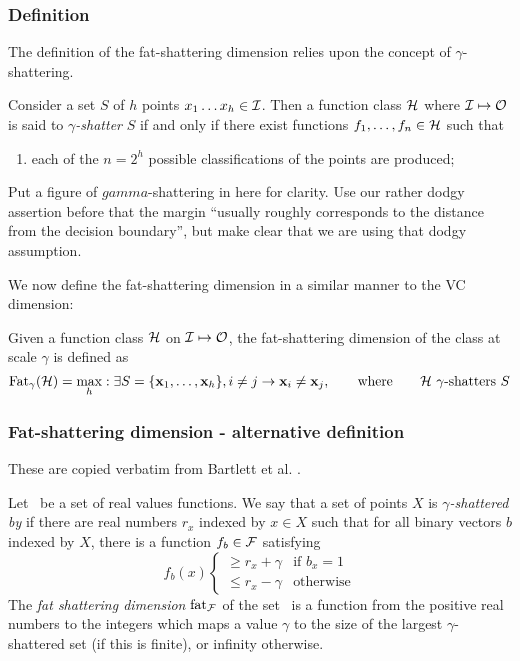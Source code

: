 \subsubsection{Definition}

The definition of the fat-shattering dimension relies upon the
concept of $\gamma$-shattering.

\begin{definition}
Consider a set $S$ of $h$ points $x_1 \ldots x_h \in \mathcal{I}$.  Then a
function class $\mathcal{H}$ where $\mathcal{I} \mapsto \mathcal{O}$ is said to
\emph{$\gamma$-shatter} $S$ if and only if there exist functions $f_1,
\ldots, f_n \in \mathcal{H}$ such that 
\begin{enumerate}
\item	each of the $n = 2^h$ possible classifications of the points
	are produced;
\end{enumerate}
\end{definition}

Put a figure of $gamma$-shattering in here for clarity.  Use our
rather dodgy assertion before that the margin ``usually roughly
corresponds to the distance from the decision boundary'', but make
clear that we are using that dodgy assumption.

We now define the fat-shattering dimension in a similar manner to the
VC dimension:

\begin{definition}
Given a function class $\mathcal{H}$ on $\mathcal{I} \mapsto \mathcal{O}$, the
fat-shattering dimension of the class at scale $\gamma$ is defined as
%
\begin{equation}
\mathrm{Fat}_{\gamma}(\mathcal{H}) = \max_{h} : \exists S = \{\mathbf{x}_1, \ldots, \mathbf{x}_h\},
i \neq j \rightarrow \mathbf{x}_i \neq \mathbf{x}_j,
\qquad \mbox{where} \qquad \mbox{\ensuremath{\mathcal{H}}\ $\gamma$-shatters $S$}
\end{equation}
\end{definition}


\subsubsection{Fat-shattering dimension - alternative definition}
These are copied verbatim from Bartlett et al. \cite{Bartlett98a}.

Let \calF\ be a set of real values functions.  We say that a set of
points $X$ is \emph{$\gamma$-shattered by \calF} if there are real
numbers $r_x$ indexed by $x \in X$ such that for all binary vectors
$b$ indexed by $X$, there is a function $f_b \in \mathcal{F}$ satisfying
\begin{equation}
f_b(x)  \left\{
	\begin{array}{ll}
		\geq r_x + \gamma & \mbox{if $b_x = 1$} \\
		\leq r_x - \gamma & \mbox{otherwise}
	\end{array}
\right.
\end{equation}
The \emph{fat shattering dimension} $\mathrm{fat}_{\mathcal{F}}$ of the set \calF\ is
a function from the positive real numbers to the integers which maps a
value $\gamma$ to the size of the largest $\gamma$-shattered set (if
this is finite), or infinity otherwise.


